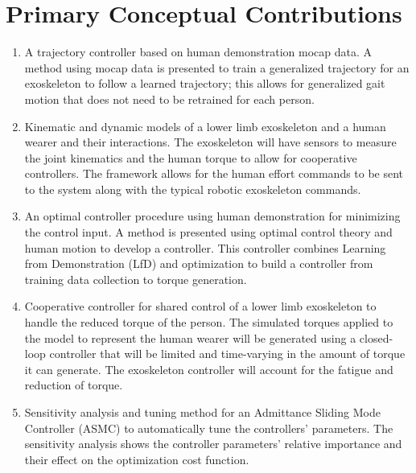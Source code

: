 \section{Primary Conceptual Contributions}
\begin{enumerate}[wide, nosep, labelindent = 0pt, topsep = 1ex]
     \item A trajectory controller based on human demonstration mocap data. A method using mocap data is presented to train a generalized trajectory for an exoskeleton to follow a learned trajectory; this allows for generalized gait motion that does not need to be retrained for each person. 
    \item Kinematic and dynamic models of a lower limb exoskeleton and a human wearer and their interactions. The exoskeleton will have sensors to measure the joint kinematics and the human torque to allow for cooperative controllers. The framework allows for the human effort commands to be sent to the system along with the typical robotic exoskeleton commands. 
    \item An optimal controller procedure using human demonstration for minimizing the control input. A method is presented using optimal control theory and human motion to develop a controller. This controller combines Learning from Demonstration (LfD) and optimization to build a controller from training data collection to torque generation. 
    \item Cooperative controller for shared control of a lower limb exoskeleton to handle the reduced torque of the person. The simulated torques applied to the model to represent the human wearer will be generated using a closed-loop controller that will be limited and time-varying in the amount of torque it can generate. The exoskeleton controller will account for the fatigue and reduction of torque. 
    \item Sensitivity analysis and tuning method for an Admittance Sliding Mode Controller (ASMC) to automatically tune the controllers' parameters. The sensitivity analysis shows the controller parameters' relative importance and their effect on the optimization cost function.  
\end{enumerate}


